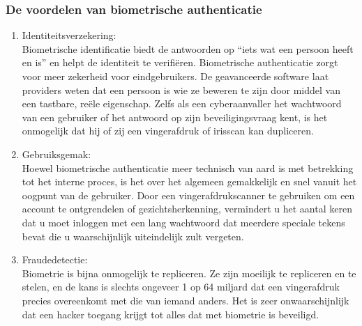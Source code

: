   \subsubsection{De voordelen van biometrische authenticatie}%
  \label{subsubsec:de-voordelen-van-biometrische-authenticatie}
  \begin{enumerate}[label=\textbf{-}]
    \item Identiteitsverzekering: \\
    Biometrische identificatie biedt de antwoorden op “iets wat een persoon heeft en is” en helpt de identiteit te verifiëren. Biometrische authenticatie zorgt voor meer zekerheid voor eindgebruikers. De geavanceerde software laat providers weten dat een persoon is wie ze beweren te zijn door middel van een tastbare, reële eigenschap. Zelfs als een cyberaanvaller het wachtwoord van een gebruiker of het antwoord op zijn beveiligingsvraag kent, is het onmogelijk dat hij of zij een vingerafdruk of irisscan kan dupliceren.
  
    \item Gebruiksgemak: \\
    Hoewel biometrische authenticatie meer technisch van aard is met betrekking tot het interne proces, is het over het algemeen gemakkelijk en snel vanuit het oogpunt van de gebruiker. Door een vingerafdrukscanner te gebruiken om een account te ontgrendelen of gezichtsherkenning, vermindert u het aantal keren dat u moet inloggen met een lang wachtwoord dat meerdere speciale tekens bevat die u waarschijnlijk uiteindelijk zult vergeten.
  
    \item Fraudedetectie: \\
    Biometrie is bijna onmogelijk te repliceren. Ze zijn moeilijk te repliceren en te stelen, en de kans is slechts ongeveer 1 op 64 miljard \autocite{Baker2021} \autocite{Lee2013} dat een vingerafdruk precies overeenkomt met die van iemand anders. Het is zeer onwaarschijnlijk dat een hacker toegang krijgt tot alles dat met biometrie is beveiligd.
  \end{enumerate}
  
